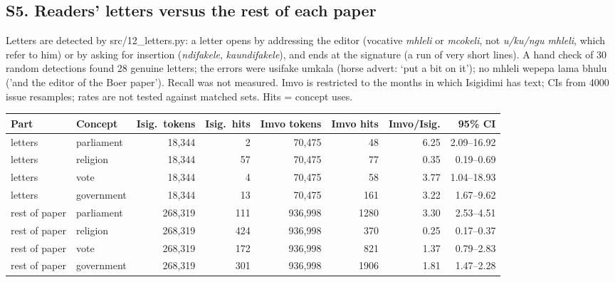 \subsection*{S5. Readers' letters versus the rest of each paper}
Letters are detected by src/12\_letters.py: a letter opens by addressing the editor (vocative \emph{mhleli} or \emph{mcokeli}, not \emph{u/ku/ngu mhleli}, which refer to him) or by asking for insertion (\emph{ndifakele}, \emph{kaundifakele}), and ends at the signature (a run of very short lines). A hand check of 30 random detections found 28 genuine letters; the errors were usifake umkala (horse advert: `put a bit on it'); no mhleli wepepa lama bhulu ('and the editor of the Boer paper'). Recall was not measured. Imvo is restricted to the months in which Isigidimi has text; CIs from 4000 issue resamples; rates are not tested against matched sets. Hits = concept uses.\\[2pt]
\begin{tabular}{@{}llrrrrrr@{}}
\toprule
Part & Concept & Isig.\ tokens & Isig.\ hits & Imvo tokens & Imvo hits & Imvo/Isig. & 95\% CI \\ \midrule
letters & parliament & 18,344 & 2 & 70,475 & 48 & 6.25 & 2.09--16.92 \\
letters & religion & 18,344 & 57 & 70,475 & 77 & 0.35 & 0.19--0.69 \\
letters & vote & 18,344 & 4 & 70,475 & 58 & 3.77 & 1.04--18.93 \\
letters & government & 18,344 & 13 & 70,475 & 161 & 3.22 & 1.67--9.62 \\
rest of paper & parliament & 268,319 & 111 & 936,998 & 1280 & 3.30 & 2.53--4.51 \\
rest of paper & religion & 268,319 & 424 & 936,998 & 370 & 0.25 & 0.17--0.37 \\
rest of paper & vote & 268,319 & 172 & 936,998 & 821 & 1.37 & 0.79--2.83 \\
rest of paper & government & 268,319 & 301 & 936,998 & 1906 & 1.81 & 1.47--2.28 \\
\bottomrule
\end{tabular}

